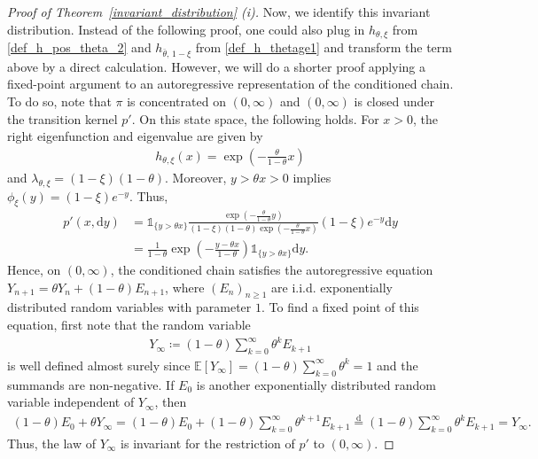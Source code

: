 \documentclass[10pt,a4paper]{amsart}
\newcommand{\E}{\mathbb{E}} %
\newcommand{\1}{\mathds{1}}
\renewcommand{\d}{\mathrm{d}}
\begin{document}
\begin{proof}[Proof of Theorem~\ref{invariant_distribution} (i)]
Now, we identify this invariant distribution. Instead of the following proof, one could also plug in $h_{\theta,\xi}$ from \eqref{def_h_pos_theta_2} and $h_{\bar\theta,\,1-\xi}$ from \eqref{def_h_thetage1} and transform the term above by a direct calculation. However, we will do a shorter proof applying a fixed-point argument to an autoregressive representation of the conditioned chain. To do so, note that  $\pi$ is concentrated on $(0,\infty)$ and $(0,\infty)$ is closed under the transition kernel $p'$. On this state space, the following holds. For $x>0$, the right eigenfunction and eigenvalue are given by 
\begin{align*} 
    h_{\theta,\xi}(x) = \exp\left( -\frac{\theta}{1-\theta}x \right) 
\end{align*} 
and $\lambda_{\theta,\xi} = (1-\xi)(1-\theta)$.
Moreover, $y>\theta x>0$ implies $ \phi_\xi(y) = (1-\xi)e^{-y}$.
Thus, 
\begin{align*} 
    p' (x,\d y) 
    &= \mathds{1}_{\{y>\theta x\}} \frac{ \exp\left( -\frac{\theta}{1-\theta}y \right) }{ (1-\xi)(1-\theta) \exp\left( -\frac{\theta}{1-\theta}x \right) } (1-\xi)e^{-y}\d y 
    \\ &= \frac{1}{1-\theta} \exp\left( -\frac{y-\theta x}{1-\theta} \right) \mathds{1}_{\{y>\theta x\}} \d y. 
\end{align*} 
Hence, on $(0,\infty)$, the conditioned chain satisfies the autoregressive equation $Y_{n+1} = \theta Y_n+(1-\theta)E_{n+1}$, 
where $(E_n)_{n\geq1}$ are i.i.d. exponentially distributed random variables with parameter $1$. To find a fixed point of this equation, first note that the random variable 
\begin{align*} 
    Y_\infty \coloneqq (1-\theta) \sum_{k=0}^\infty \theta^kE_{k+1} 
\end{align*} 
is well defined almost surely since $\E[Y_\infty]=(1-\theta)\sum_{k=0}^\infty \theta^k=1$ and the summands are non-negative. If $E_0$ is another exponentially distributed random variable independent of $Y_\infty$, then 
\begin{align*} 
    (1-\theta)E_0+\theta Y_\infty 
    = (1-\theta)E_0 + (1-\theta) \sum_{k=0}^\infty \theta^{k+1}E_{k+1} 
    \overset{\d}{=} (1-\theta) \sum_{k=0}^\infty \theta^kE_{k+1} 
    = Y_\infty. 
\end{align*} 
Thus, the law of $Y_\infty$ is invariant for the restriction of $p'$ to $(0,\infty)$. 


\end{proof}
\end{document}
